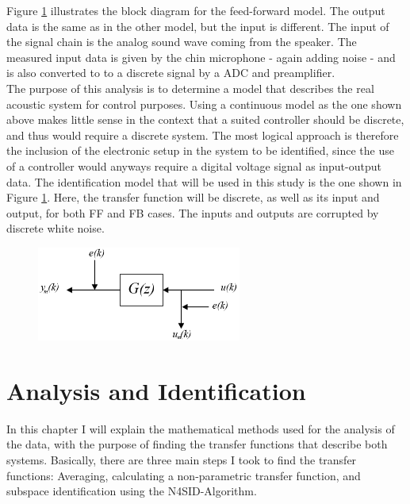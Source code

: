 Figure \ref{} illustrates the block diagram for the feed-forward model. The output data is the same as in the other model, but the input is different. The input of the signal chain is the analog sound wave coming from the speaker. The measured input data is given by the chin microphone - again adding noise - and is also converted to to a discrete signal by a ADC and preamplifier.\\

The purpose of this analysis is to determine a model that describes the real acoustic system for control purposes. Using a continuous model as the one shown above makes little sense in the context that a suited controller should be discrete, and thus would require a discrete system. The most logical approach is therefore the inclusion of the electronic setup in the system to be identified, since the use of a controller would anyways require a digital voltage signal as input-output data. The identification model that will be used in this study is the one shown in Figure \ref{}. Here, the transfer function will be discrete, as well as its input and output, for both FF and FB cases. The inputs and outputs are corrupted by discrete white noise.

\begin{figure}[h]
\centering
\includegraphics[width=0.6\textwidth]{pics/discrete_model}
\caption{}
\label{pic:}
\end{figure}



\chapter{Analysis and Identification}

In this chapter I will explain the mathematical methods used for the analysis of the data, with the purpose of finding the transfer functions that describe both systems. Basically, there are three main steps I took to find the transfer functions: Averaging, calculating a non-parametric transfer function, and subspace identification using the N4SID-Algorithm.\\

